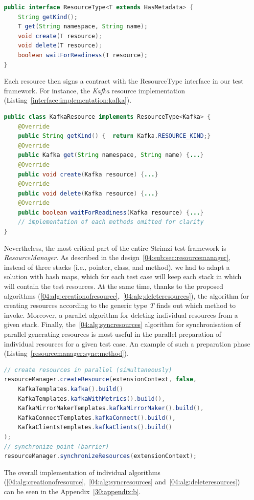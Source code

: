 \begin{lstlisting}[language=Java,label=interface:resourcetype,caption=Interface used across all resources,frame=tb]
public interface ResourceType<T extends HasMetadata> {
    String getKind();
    T get(String namespace, String name);
    void create(T resource);
    void delete(T resource);
    boolean waitForReadiness(T resource);
}
\end{lstlisting}
Each resource then signs a contract with the ResourceType interface in our test framework.
For instance, the \emph{Kafka} resource implementation (Listing~\ref{interface:implementation:kafka}).
\begin{lstlisting}[language=Java,label=interface:implementation:kafka,caption=Kafka resource sings contract with ResourceType interface,frame=tb]
public class KafkaResource implements ResourceType<Kafka> {
    @Override
    public String getKind() {  return Kafka.RESOURCE_KIND;}
    @Override
    public Kafka get(String namespace, String name) {...}
    @Override
    public void create(Kafka resource) {...}
    @Override
    public void delete(Kafka resource) {...}
    @Override
    public boolean waitForReadiness(Kafka resource) {...}
    // implementation of each methods omitted for clarity
}
\end{lstlisting}

Nevertheless, the most critical part of the entire Strimzi test framework is \emph{ResourceManager}.
As described in the design~\ref{04:sub:sec:resourcemanager}, instead of three stacks (i.e., pointer, class, and method),
we had to adapt a solution with hash maps, which for each test case will keep each stack in which will contain the test resources.
At the same time, thanks to the proposed algorithms (\ref{04:alg:creationofresource},~\ref{04:alg:deleteresources}),
the algorithm for creating resources according to the generic type \emph{T} finds out which method to invoke.
Moreover, a parallel algorithm for deleting individual resources from a given stack.
Finally, the~\ref{04:alg:syncresources} algorithm for synchronisation of parallel generating resources is most useful
in the parallel preparation of individual resources for a given test case.
An example of such a preparation phase (Listing~\ref{resourcemanager:sync:method}).
\begin{lstlisting}[language=Java,label=resourcemanager:sync:method,caption=Example of parallel preparation of resources,frame=tb]
// create resources in parallel (simultaneously)
resourceManager.createResource(extensionContext, false,
    KafkaTemplates.kafka().build()
    KafkaTemplates.kafkaWithMetrics().build(),
    KafkaMirrorMakerTemplates.kafkaMirrorMaker().build(),
    KafkaConnectTemplates.kafkaConnect().build(),
    KafkaClientsTemplates.kafkaClients().build()
);
// synchronize point (barrier)
resourceManager.synchronizeResources(extensionContext);
\end{lstlisting}
The overall implementation of individual algorithms (\ref{04:alg:creationofresource},~\ref{04:alg:syncresources} and~\ref{04:alg:deleteresources})
can be seen in the Appendix~\ref{30:appendix:b}.

